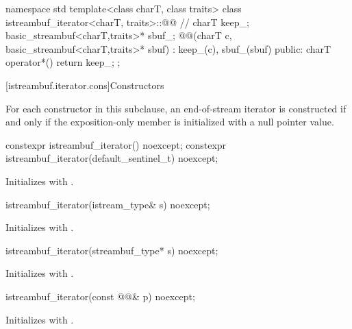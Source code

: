 %
\begin{codeblock}
namespace std {
  template<class charT, class traits>
  class istreambuf_iterator<charT, traits>::@@ { // \expos
    charT keep_;
    basic_streambuf<charT,traits>* sbuf_;
    @@(charT c, basic_streambuf<charT,traits>* sbuf)
      : keep_(c), sbuf_(sbuf) { }
  public:
    charT operator*() { return keep_; }
  };
}
\end{codeblock}

[istreambuf.iterator.cons]{Constructors}

\pnum
For each  constructor in this subclause,
an end-of-stream iterator is constructed if and only if
the exposition-only member  is initialized with a null pointer value.


%
\begin{itemdecl}
constexpr istreambuf_iterator() noexcept;
constexpr istreambuf_iterator(default_sentinel_t) noexcept;
\end{itemdecl}

\begin{itemdescr}
\pnum
\effects
Initializes  with .
\end{itemdescr}

%
\begin{itemdecl}
istreambuf_iterator(istream_type& s) noexcept;
\end{itemdecl}

\begin{itemdescr}
\pnum
\effects
Initializes  with .
\end{itemdescr}

%
\begin{itemdecl}
istreambuf_iterator(streambuf_type* s) noexcept;
\end{itemdecl}

\begin{itemdescr}
\pnum
\effects
Initializes  with .
\end{itemdescr}

%
\begin{itemdecl}
istreambuf_iterator(const @@& p) noexcept;
\end{itemdecl}

\begin{itemdescr}
\pnum
\effects
Initializes  with .
\end{itemdescr}

